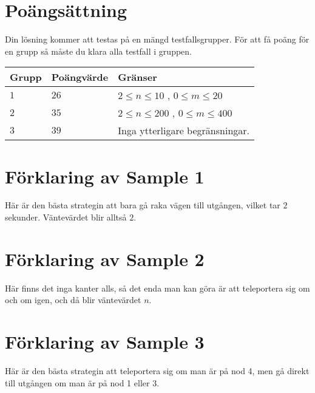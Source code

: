 \section*{Poängsättning}
Din lösning kommer att testas på en mängd testfallsgrupper.
För att få poäng för en grupp så måste du klara alla testfall i gruppen.

\noindent
\begin{tabular}{| l | l | p{12cm} |}
  \hline
  Grupp & Poängvärde & Gränser \\ \hline
    $1$   & $26$     & $2 \le n \le 10$ , $0 \le m \le 20$ \\ \hline
    $2$   & $35$     & $2 \le n \le 200$ , $0 \le m \le 400$ \\ \hline
    $3$   & $39$     & Inga ytterligare begränsningar. \\ \hline
\end{tabular}

\section*{Förklaring av Sample 1}
Här är den bästa strategin att bara gå raka vägen till utgången, vilket tar $2$ sekunder. Väntevärdet blir alltså $2$.

\section*{Förklaring av Sample 2}
Här finns det inga kanter alls, så det enda man kan göra är att teleportera sig om och om igen, och då blir väntevärdet $n$.

\section*{Förklaring av Sample 3}
Här är den bästa strategin att teleportera sig om man är på nod 4, men gå direkt till utgången om man är på nod 1 eller 3.
